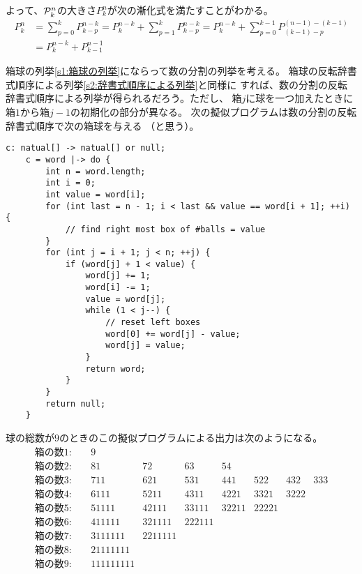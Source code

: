 	よって、${\mathcal{P}}_k^n$の大きさ$P_k^n$が次の漸化式を満たすことがわかる。
	\begin{equation*}\begin{split} %
		P_k^n &= \sum_{p=0}^kP_{k-p}^{n-k}
			= P_k^{n-k} + \sum_{p=1}^kP_{k-p}^{n-k}
			= P_k^{n-k} + \sum_{p=0}^{k-1}P_{(k-1)-p}^{(n-1)-(k-1)} \\
			&= P_k^{n-k} + P_{k-1}^{n-1}
	\end{split}\end{equation*} %

	箱球の列挙\ref{s1:箱球の列挙}にならって数の分割の列挙を考える。
	箱球の反転辞書式順序による列挙\ref{s2:辞書式順序による列挙}と同様に
	すれば、数の分割の反転辞書式順序による列挙が得られるだろう。ただし、
	箱$j$に球を一つ加えたときに箱$1$から箱$j-1$の初期化の部分が異なる。
	次の擬似プログラムは数の分割の反転辞書式順序で次の箱球を与える
	（と思う）。
	\begin{lstlisting}[caption=数の分割の反転辞書式順序
	, label=code:数の分割の反転辞書式順序]
	c: natual[] -> natual[] or null;
	c = word |-> do {
		int n = word.length;
		int i = 0;
		int value = word[i];
		for (int last = n - 1; i < last && value == word[i + 1]; ++i) {
			// find right most box of #balls = value
		}
		for (int j = i + 1; j < n; ++j) {
			if (word[j] + 1 < value) {
				word[j] += 1;
				word[i] -= 1;
				value = word[j];
				while (1 < j--) {
					// reset left boxes
					word[0] += word[j] - value;
					word[j] = value;
				}
				return word;
			}
		}
		return null;
	}
	\end{lstlisting}
	球の総数が$9$のときのこの擬似プログラムによる出力は次のようになる。
	\begin{equation}\label{eq:6の分割の反転辞書式順序}
	\begin{array}{llllllll} %
		\text{箱の数}1:\quad & 9 \\
		\text{箱の数}2:\quad & 81 & 72 & 63 & 54 \\
		\text{箱の数}3:\quad & 711 & 621 & 531 & 441 & 522 & 432 & 333 \\
		\text{箱の数}4:\quad & 6111 & 5211 & 4311 & 4221 & 3321 & 3222 \\
		\text{箱の数}5:\quad & 51111 & 42111 & 33111 & 32211 & 22221 \\
		\text{箱の数}6:\quad & 411111 & 321111 & 222111 \\
		\text{箱の数}7:\quad & 3111111 & 2211111 \\
		\text{箱の数}8:\quad & 21111111 \\
		\text{箱の数}9:\quad & 111111111 \\
	\end{array}\end{equation} %
